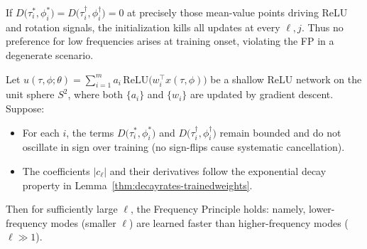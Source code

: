 \documentclass[review,onefignum,onetabnum,onealgnum]{siamart250106}
\numberwithin{theorem}{section}
\begin{document}
\begin{remark}
If $D\bigl(\tau_i^*,\phi_i^*\bigr)=D\bigl(\tau_i^\dagger,\phi_i^\dagger\bigr)=0$ at precisely those mean-value points driving ReLU and rotation signals, the initialization kills all updates at every $\ell,j$.  Thus no preference for low frequencies arises at training onset, violating the FP in a degenerate scenario.
\end{remark}

\begin{remark}
    Let 
\(
u(\tau,\phi; \theta) 
= 
\sum_{i=1}^{m} a_i\,\mathrm{ReLU}\!\bigl(w_i^\top x(\tau,\phi)\bigr)
\)
be a shallow ReLU network on the unit sphere \(S^2\), where both \(\{a_i\}\) and \(\{w_i\}\) are updated by gradient descent.  Suppose:
\begin{itemize}
\item 
For each \(i\), the terms \(D\bigl(\tau_i^*,\phi_i^*\bigr)\) and \(D\bigl(\tau_i^\dagger,\phi_i^\dagger\bigr)\) remain bounded and do not oscillate in sign over training (no sign-flips cause systematic cancellation).
\item 
The coefficients \(\bigl|c_{\ell}\bigr|\) and their derivatives follow the exponential decay property in Lemma~\ref{thm:decayrates-trainedweights}.
\end{itemize}
Then for sufficiently large \(\ell\), the Frequency Principle holds: namely, lower-frequency modes (smaller \(\ell\)) are learned faster than higher-frequency modes (\(\ell\gg1\)).
\end{remark}



\end{document}

